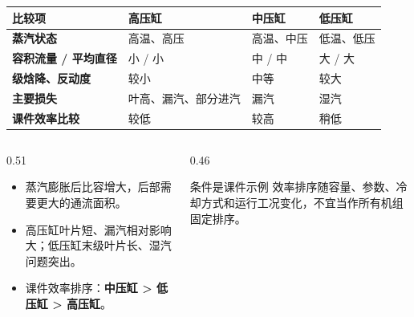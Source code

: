 \begin{frame}[t,shrink]{}
\begin{smalltab}
\begin{tabularx}{\linewidth}{@{}>{\bfseries}p{22mm}XXX@{}}
  \toprule
  比较项 & 高压缸 & 中压缸 & 低压缸\\
  \midrule
  蒸汽状态 & 高温、高压 & 高温、中压 & 低温、低压\\
  容积流量 / 平均直径 & 小 / 小 & 中 / 中 & 大 / 大\\
  级焓降、反动度 & 较小 & 中等 & 较大\\
  主要损失 & 叶高、漏汽、部分进汽 & 漏汽 & 湿汽\\
  课件效率比较 & 较低 & 较高 & 稍低\\
  \bottomrule
\end{tabularx}
\end{smalltab}
\begin{columns}[T,onlytextwidth]
\begin{column}{0.51\textwidth}
  \begin{itemize}
    \item 蒸汽膨胀后比容增大，后部需要更大的通流面积。
    \item 高压缸叶片短、漏汽相对影响大；低压缸末级叶片长、湿汽问题突出。
    \item 课件效率排序：\textbf{中压缸 > 低压缸 > 高压缸}。
  \end{itemize}
\end{column}
\begin{column}{0.46\textwidth}
  \begin{amberbox}{条件是课件示例}
  \small 效率排序随容量、参数、冷却方式和运行工况变化，不宜当作所有机组固定排序。
  \end{amberbox}
\end{column}
\end{columns}
\end{frame}

